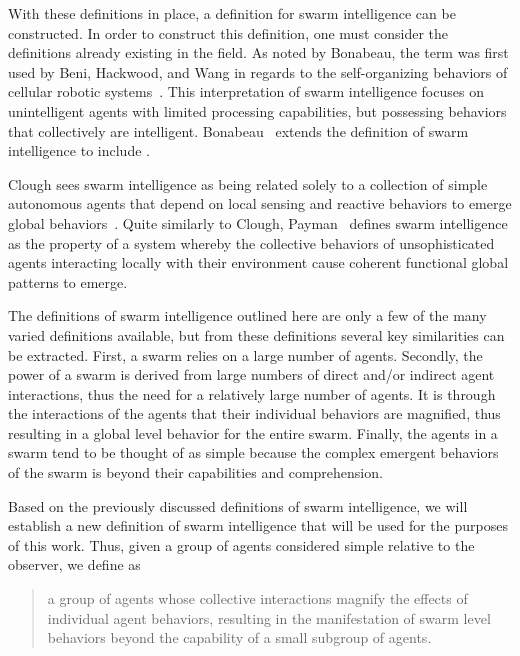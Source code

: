 With these definitions in place, a definition for swarm intelligence can be constructed.  In order to construct this definition, one must consider the definitions already existing in the field.  As noted by Bonabeau, the term  was first used by Beni, Hackwood, and Wang in regards to the self-organizing behaviors of cellular robotic systems~\cite{beni:CellularRoboticSystems}.  This interpretation of swarm intelligence focuses on unintelligent agents with limited processing capabilities, but possessing behaviors that collectively are intelligent.  Bonabeau~\cite{bonabeau:SwarmIntelligence} extends the definition of swarm intelligence to include .  

Clough sees swarm intelligence as being related solely to a collection of simple autonomous agents that depend on local sensing and reactive behaviors to emerge global behaviors~\cite{clough:SwarmingUAVs}.  Quite similarly to Clough, Payman~\cite{arabshahi:SwarmIntelligence} defines swarm intelligence as the property of a system whereby the collective behaviors of unsophisticated agents interacting locally with their environment cause coherent functional global patterns to emerge.

The definitions of swarm intelligence outlined here are only a few of the many varied definitions available, but from these definitions several key similarities can be extracted.  First, a swarm relies on a large number of agents.  Secondly, the power of a swarm is derived from large numbers of direct and/or indirect agent interactions, thus the need for a relatively large number of agents.  It is through the interactions of the agents that their individual behaviors are magnified, thus resulting in a global level behavior for the entire swarm.  Finally, the agents in a swarm tend to be thought of as simple because the complex emergent behaviors of the swarm is beyond their capabilities and comprehension.

Based on the previously discussed definitions of swarm intelligence, we will establish a new definition of swarm intelligence that will be used for the purposes of this work.  Thus, given a group of agents considered simple relative to the observer, we define  
as
\begin{quote}
a group of agents whose collective interactions magnify the effects of individual agent behaviors, resulting in the manifestation of swarm level behaviors beyond the capability of a small subgroup of agents.
\end{quote}

